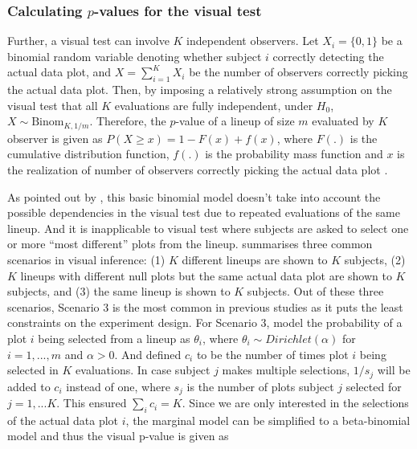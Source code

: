 \documentclass[]{interact}
\theoremstyle{plain}%
\theoremstyle{definition}
\theoremstyle{remark}
\begin{document}
\hypertarget{calculating-p-values-for-the-visual-test}{%
\subsubsection{\texorpdfstring{Calculating \(p\)-values for the visual
test}{Calculating p-values for the visual test}}\label{calculating-p-values-for-the-visual-test}}

Further, a visual test can involve \(K\) independent observers. Let
\(X_i = \{0,1\}\) be a binomial random variable denoting whether subject
\(i\) correctly detecting the actual data plot, and
\(X = \sum_{i=1}^{K}X_i\) be the number of observers correctly picking
the actual data plot. Then, by imposing a relatively strong assumption
on the visual test that all \(K\) evaluations are fully independent,
under \(H_0\), \(X \sim \mathrm{Binom}_{K,1/m}\). Therefore, the
\(p\)-value of a lineup of size \(m\) evaluated by \(K\) observer is
given as \(P(X \geq x) = 1 - F(x) + f(x)\), where \(F(.)\) is the
cumulative distribution function, \(f(.)\) is the probability mass
function and \(x\) is the realization of number of observers correctly
picking the actual data plot \citep{majumder_validation_2013}.

As pointed out by \citet{vanderplas2021statistical}, this basic binomial
model doesn't take into account the possible dependencies in the visual
test due to repeated evaluations of the same lineup. And it is
inapplicable to visual test where subjects are asked to select one or
more ``most different'' plots from the lineup.
\citet{vanderplas2021statistical} summarises three common scenarios in
visual inference: (1) \(K\) different lineups are shown to \(K\)
subjects, (2) \(K\) lineups with different null plots but the same
actual data plot are shown to \(K\) subjects, and (3) the same lineup is
shown to \(K\) subjects. Out of these three scenarios, Scenario 3 is the
most common in previous studies as it puts the least constraints on the
experiment design. For Scenario 3, \citet{vanderplas2021statistical}
model the probability of a plot \(i\) being selected from a lineup as
\(\theta_i\), where \(\theta_i \sim Dirichlet(\alpha)\) for
\(i=1,...,m\) and \(\alpha > 0\). And defined \(c_i\) to be the number
of times plot \(i\) being selected in \(K\) evaluations. In case subject
\(j\) makes multiple selections, \(1/s_j\) will be added to \(c_i\)
instead of one, where \(s_j\) is the number of plots subject \(j\)
selected for \(j=1,...K\). This ensured \(\sum_{i}c_i=K\). Since we are
only interested in the selections of the actual data plot \(i\), the
marginal model can be simplified to a beta-binomial model and thus the
visual p-value is given as
\end{document}
